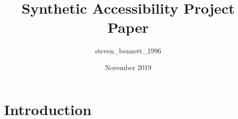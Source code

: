 \documentclass{article}
\title{Synthetic Accessibility Project Paper}
\author{steven_bennett_1996 }
\date{November 2019}
\begin{document}
\maketitle

\section{Introduction}
\end{document}
